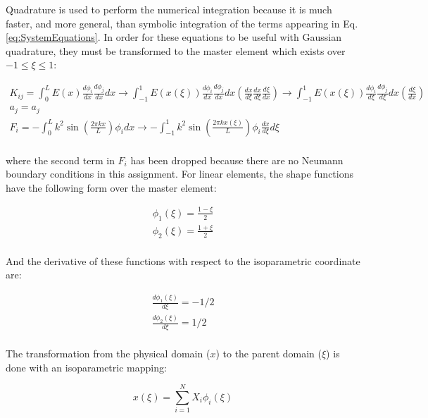 \documentclass[10pt]{article}
\begin{document}
Quadrature is used to perform the numerical integration because it is much faster, and more general, than symbolic integration of the terms appearing in Eq. \eqref{eq:SystemEquations}. In order for these equations to be useful with Gaussian quadrature, they must be transformed to the master element which exists over \(-1\leq\xi\leq1\):

\begin{equation}
\begin{aligned}
K_{ij}=\int_{0}^{L}E(x)\frac{d\phi_i}{dx}\frac{d\phi_j}{dx}dx\rightarrow\int_{-1}^{1}E(x(\xi))\frac{d\phi_i}{dx}\frac{d\phi_j}{dx}dx\left(\frac{dx}{d\xi}\frac{dx}{d\xi}\frac{d\xi}{dx}\right)\rightarrow\int_{-1}^{1}E(x(\xi))\frac{d\phi_i}{d\xi}\frac{d\phi_j}{d\xi}dx\left(\frac{d\xi}{dx}\right)\\
a_j=a_j\\
F_i=-\int_{0}^{L}k^2\sin{\left(\frac{2\pi kx}{L}\right)}\phi_idx\rightarrow-\int_{-1}^{1}k^2\sin{\left(\frac{2\pi kx(\xi)}{L}\right)}\phi_i\frac{dx}{d\xi}d\xi\\
\end{aligned}
\end{equation} 

where the second term in \(F_i\) has been dropped because there are no Neumann boundary conditions in this assignment. For linear elements, the shape functions have the following form over the master element:

\begin{equation}
\begin{aligned}
\phi_1(\xi)=\frac{1-\xi}{2}\\
\phi_2(\xi)=\frac{1+\xi}{2}\\
\end{aligned}
\end{equation}

And the derivative of these functions with respect to the isoparametric coordinate are:

\begin{equation}
\begin{aligned}
\frac{d\phi_1(\xi)}{d\xi}=-1/2\\
\frac{d\phi_2(\xi)}{d\xi}=1/2\\
\end{aligned}
\end{equation}

The transformation from the physical domain (\(x\)) to the parent domain (\(\xi\)) is done with an isoparametric mapping:

\begin{equation}
\label{eq:Mapping}
x(\xi)=\sum_{i=1}^{N} X_i\phi_i(\xi)
\end{equation}
\end{document}
